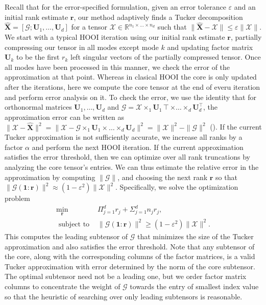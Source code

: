     Recall that for the error-specified formulation, given an error tolerance
    $\varepsilon$ and an initial rank estimate $\mathbf{r}$, our method adaptively
    finds a Tucker decomposition $\mathbf{\hat{X}} = [\mathcal{G}; \mathbf{U}_{1}, \dots,
    \mathbf{U}_{d}]$ for a tensor $\mathcal{X} \in \mathbb{R}^{n_1 \times \dots \times
    n_d}$ such that $\| \mathbf{\hat{X}} - \mathcal{X} \| \leq \varepsilon \| \mathcal{X} \|$.
    We start with a typical HOOI iteration using our initial rank estimate
    $\mathbf{r}$, partially compressing our tensor in all modes except mode $k$ and
    updating factor matrix $\mathbf{U}_{k}$ to be the first $r_k$ left singular
    vectors of the partially compressed tensor. Once all modes have been
    processed in this manner, we check the error of the approximation at that
    point. 
    Whereas in clasical HOOI the core is only updated after the iterations, here
    we compute the core tensor at the end of everu iteration and perform error
    analysis on it. To check the error, we use the identity that for orthonormal
    matrices $\mathbf{U}_{1},\dots,\mathbf{U}_{d}$ and $\mathcal{G} = \mathcal{X} \times_1
    \mathbf{U}_{1}\intercal \times \dots \times_d \mathbf{U}_{d}^\intercal$, the approximation error can be
    written as $\| \mathcal{X} - \mathbf{\hat{X}} \|^2 = \| \mathcal{X} - \mathcal{G} \times_1
    \mathbf{U}_{1} \times \dots \times_d \mathbf{U}_{d} \|^2 = \| \mathcal{X} \|^2 - \| \mathcal{G}
    \|^2$ (\cite[Proposition 6.3]{BK25}). If the current Tucker approximation is
    not sufficiently accurate, we increase all ranks by a factor $\alpha$ and
    perform the next HOOI iteration. If the current approximation satisfies the
    error threshold, then we can optimize over all rank truncations by analyzing
    the core tensor's entries.
    We can thus estimate the relative error in the approximation by computing
    $\| \mathcal{G} \|$, and choosing the next rank $\mathbf{r}$ so that $\|
    \mathcal{G}(\mathbf{1}:\mathbf{r})\|^2 \approx (1 - \varepsilon^2) \| \mathcal{X} \|^2.$ 
    Specifically, we solve the optimization problem
    \begin{equation}\label{eq:rankcond}
    \begin{aligned}
    \min_{\mathbf{r}}  \quad & \Pi_{j=1}^d r_j + \Sigma_{j=1}^{d} n_j r_j,\\ 
    \text{ subject to } &\|\mathcal{G}(\mathbf{1}:\mathbf{r}) \|^2 \geq (1 - \varepsilon^2) \| \mathcal{X} \|^2.
    \end{aligned}
    \end{equation}
    This computes the leading subtensor of $\mathcal{G}$ that minimizes the size of
    the Tucker approximation and also satisfies the error threshold. Note that
    any subtensor of the core, along with the corresponding columns of the
    factor matrices, is a valid Tucker approximation with error determined by
    the norm of the core subtensor. The optimal subtensor need not be a leading
    one, but we order factor matrix columns to concentrate the weight of
    $\mathcal{G}$ towards the entry of smallest index value so that the heuristic of
    searching over only leading subtensors is reasonable.

